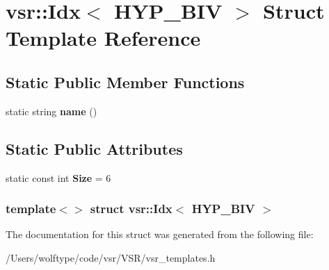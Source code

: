 \hypertarget{structvsr_1_1_idx_3_01_h_y_p___b_i_v_01_4}{\section{vsr\-:\-:Idx$<$ H\-Y\-P\-\_\-\-B\-I\-V $>$ Struct Template Reference}
\label{structvsr_1_1_idx_3_01_h_y_p___b_i_v_01_4}
}
\subsection*{Static Public Member Functions}
\begin{DoxyCompactItemize}
\item 
\hypertarget{structvsr_1_1_idx_3_01_h_y_p___b_i_v_01_4_aab33a574dbf93d05d43b3eba46acec61}{static string {\bfseries name} ()}\label{structvsr_1_1_idx_3_01_h_y_p___b_i_v_01_4_aab33a574dbf93d05d43b3eba46acec61}

\end{DoxyCompactItemize}
\subsection*{Static Public Attributes}
\begin{DoxyCompactItemize}
\item 
\hypertarget{structvsr_1_1_idx_3_01_h_y_p___b_i_v_01_4_a23424faa1fa3dac60e6901042ce91479}{static const int {\bfseries Size} = 6}\label{structvsr_1_1_idx_3_01_h_y_p___b_i_v_01_4_a23424faa1fa3dac60e6901042ce91479}

\end{DoxyCompactItemize}
\subsubsection*{template$<$$>$ struct vsr\-::\-Idx$<$ H\-Y\-P\-\_\-\-B\-I\-V $>$}



The documentation for this struct was generated from the following file\-:\begin{DoxyCompactItemize}
\item 
/\-Users/wolftype/code/vsr/\-V\-S\-R/vsr\-\_\-templates.\-h\end{DoxyCompactItemize}
